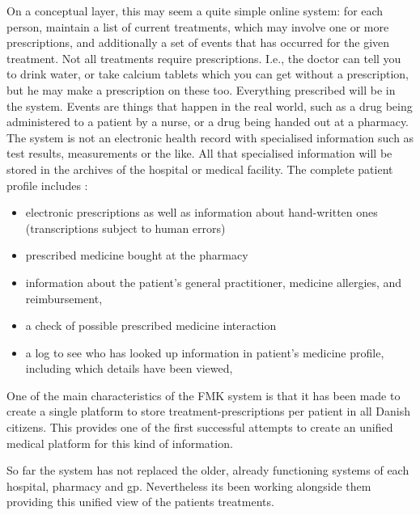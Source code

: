 \documentclass[english]{article}
\begin{document}
On a conceptual layer, this may seem a quite simple online system: for each person, maintain a list of current treatments, which may involve one or more prescriptions, and additionally a set of events that has occurred for the given treatment. Not all treatments require prescriptions. I.e.,
the doctor can tell you to drink water, or take calcium tablets which you can get without a prescription, but he may make a prescription on
these too. Everything prescribed will be in the system. Events are things that happen in the real world, such as a drug being administered to a patient by a nurse, or a drug being handed out at a pharmacy. The system is not an electronic health record with specialised information such as test results, measurements or the like. All that specialised information will be stored in the archives of the hospital or medical facility.
The complete patient profile includes :
\begin{itemize}
	\item electronic prescriptions as well as information about hand-written ones (transcriptions subject to human errors) 
	\item prescribed medicine bought at the pharmacy  
	\item information about the patient's general practitioner, medicine allergies, and reimbursement,
	\item a check of possible prescribed medicine interaction 
	\item a log to see who has looked up information in patient's medicine profile, including which details have been viewed,
\end{itemize}

One of the main characteristics of the FMK system is that it has been made to create a single platform to store treatment-prescriptions per patient in all Danish citizens. This provides one of the first successful attempts to create an unified medical platform for this kind of information.

So far the system has not replaced the older, already functioning systems of each hospital, pharmacy and \gls{gp}. Nevertheless its been working alongside them providing this unified view of the patients treatments.
\end{document}

